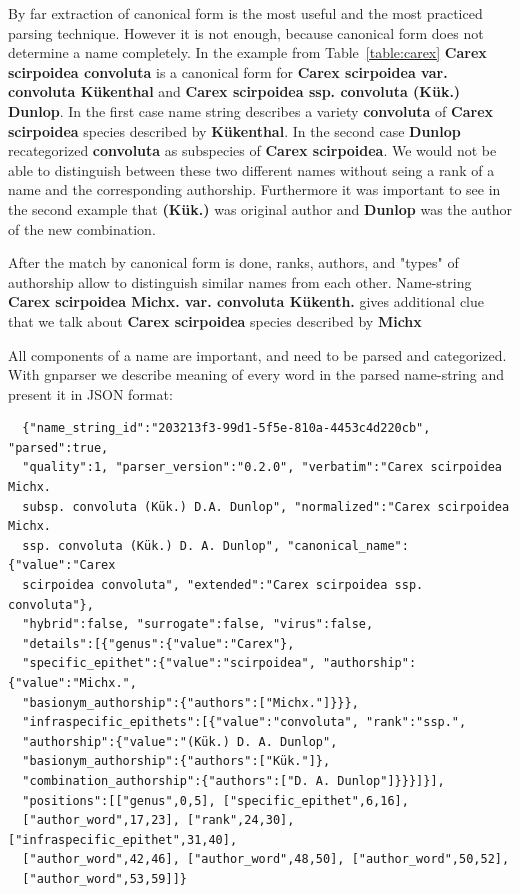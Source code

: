 \documentclass{bmcart}
\begin{document}
By far extraction of canonical form is the most useful and the most practiced
parsing technique. However it is not enough, because canonical form does not
determine a name completely. In the example from Table~\ref{table:carex}
\textbf{Carex scirpoidea convoluta} is a canonical form for \textbf{Carex
scirpoidea var. convoluta Kükenthal} and \textbf{Carex scirpoidea ssp.
convoluta (Kük.) Dunlop}. In the first case name string describes a variety
\textbf{convoluta} of \textbf{Carex scirpoidea} species described by
\textbf{Kükenthal}. In the second case \textbf{Dunlop} recategorized \textbf
{convoluta} as subspecies of \textbf{Carex scirpoidea}. We would not be able
to distinguish between these two different names without seing a rank of a
name and the corresponding authorship. Furthermore it was important to see in
the second example that \textbf{(Kük.)} was original author and
\textbf{Dunlop} was the author of the new combination.

After the match by canonical form is done, ranks, authors, and "types" of
authorship allow to distinguish similar names from each other.
Name-string \textbf{Carex scirpoidea Michx. var. convoluta Kükenth.} gives
additional clue that we talk about \textbf{Carex scirpoidea} species described
by \textbf{Michx}

All components of a name are important, and need to be parsed and categorized.
With gnparser we describe meaning of every word in the parsed name-string
and present it in JSON format:

\begin{verbatim}
  {"name_string_id":"203213f3-99d1-5f5e-810a-4453c4d220cb", "parsed":true,
  "quality":1, "parser_version":"0.2.0", "verbatim":"Carex scirpoidea Michx.
  subsp. convoluta (Kük.) D.A. Dunlop", "normalized":"Carex scirpoidea Michx.
  ssp. convoluta (Kük.) D. A. Dunlop", "canonical_name":{"value":"Carex
  scirpoidea convoluta", "extended":"Carex scirpoidea ssp. convoluta"},
  "hybrid":false, "surrogate":false, "virus":false,
  "details":[{"genus":{"value":"Carex"},
  "specific_epithet":{"value":"scirpoidea", "authorship":{"value":"Michx.",
  "basionym_authorship":{"authors":["Michx."]}}},
  "infraspecific_epithets":[{"value":"convoluta", "rank":"ssp.",
  "authorship":{"value":"(Kük.) D. A. Dunlop",
  "basionym_authorship":{"authors":["Kük."]},
  "combination_authorship":{"authors":["D. A. Dunlop"]}}}]}],
  "positions":[["genus",0,5], ["specific_epithet",6,16],
  ["author_word",17,23], ["rank",24,30], ["infraspecific_epithet",31,40],
  ["author_word",42,46], ["author_word",48,50], ["author_word",50,52],
  ["author_word",53,59]]}
\end{verbatim}
\end{document}
